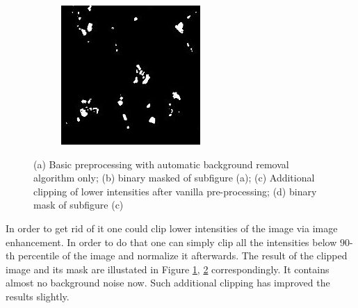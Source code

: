 \begin{figure}[htb]
\begin{subfigure}[b]{0.22\textwidth}
		\caption{}
		\label{subfig:clipping}
	\end{subfigure}
	\hfill
	\begin{subfigure}[b]{0.22\textwidth}
		\centering
		\includegraphics[width=\textwidth]{bilder/preprocessing/crop_golgi_full_processed_mask.png}
		\caption{}
		\label{subfig:clipping-mask}
	\end{subfigure}
	   \caption{(a) Basic preprocessing with automatic background removal algorithm only; (b) binary masked of subfigure (a); (c) Additional clipping of lower intensities after vanilla pre-processing; (d) binary mask of subfigure (c)}
	   \label{fig:pre-processing-golgi}
\end{figure}
In order to get rid of it one could clip lower intensities of the image via image enhancement. In order to do that one can simply clip all the intensities below $90$-th percentile of the image and normalize it afterwards. The result of the clipped image and its mask are illustated in Figure \ref{subfig:clipping}, \ref{subfig:clipping-mask} correspondingly. It contains almost no background noise now. Such additional clipping has improved the results slightly.